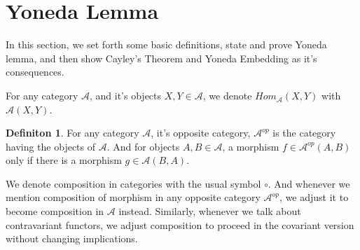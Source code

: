 \documentclass[18pt,a4paper]{article}
\theoremstyle{definition}
\newtheorem{definition}[theorem]{Definiton}
\begin{document}
\section{Yoneda Lemma} %
In this section, we set forth some basic definitions, state and prove Yoneda lemma, and then
show Cayley's Theorem and Yoneda Embedding as it's consequences.

For any category $\mathcal{A}$, and it's objects $X,Y\in \mathcal{A} $,
we denote $Hom_{\mathcal{A}}^{\mbox{}}(X,Y)$ with $\mathcal{A} (X,Y)$.

\begin{definition} %
	For any category $\mathcal{A} $, it's opposite category, $\mathcal{A}^{op}$
	is the category having the objects of $\mathcal{A}$.
	And for objects $A,B \in \mathcal{A} $, a morphism $f \in \mathcal{A}^{op} (A,B)$
	only if there is a morphism $g \in \mathcal{A}(B,A)$.
\end{definition}

We denote composition in categories with the usual symbol $\circ $. And whenever we mention composition
of morphism in any opposite category $\mathcal{A} ^{op}$, we adjust it to
become composition in $\mathcal{A}$ instead. Similarly, whenever we talk about contravariant
functors, we adjust composition to proceed in the covariant version without changing implications.
\end{document}
